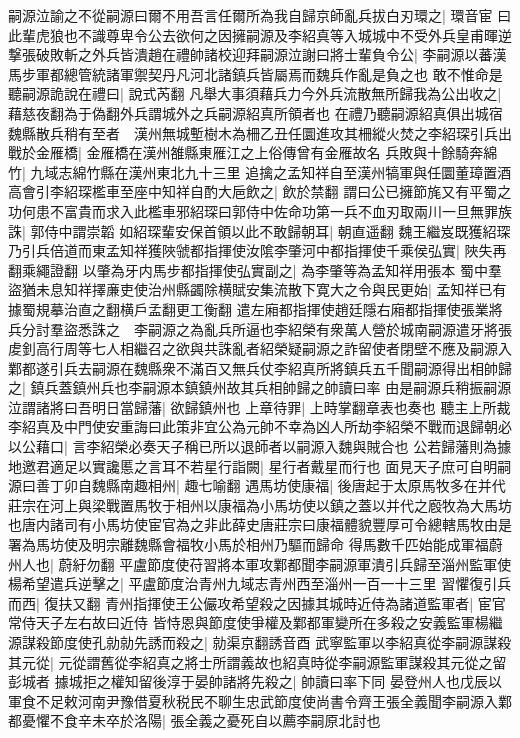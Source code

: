 嗣源泣諭之不從嗣源曰爾不用吾言任爾所為我自歸京師亂兵拔白刃環之|{
	環音宦}
曰此輩虎狼也不識尊卑令公去欲何之因擁嗣源及李紹真等入城城中不受外兵皇甫暉逆撃張破敗斬之外兵皆潰趙在禮帥諸校迎拜嗣源泣謝曰將士輩負令公|{
	李嗣源以蕃漢馬步軍都總管統諸軍禦契丹凡河北諸鎮兵皆屬焉而魏兵作亂是負之也}
敢不惟命是聽嗣源詭說在禮曰|{
	說式芮翻}
凡舉大事須藉兵力今外兵流散無所歸我為公出收之|{
	藉慈夜翻為于偽翻外兵謂城外之兵嗣源紹真所領者也}
在禮乃聽嗣源紹真俱出城宿魏縣散兵稍有至者　漢州無城塹樹木為柵乙丑任圜進攻其柵縱火焚之李紹琛引兵出戰於金雁橋|{
	金雁橋在漢州雒縣東雁江之上俗傳曾有金雁故名}
兵敗與十餘騎奔綿竹|{
	九域志綿竹縣在漢州東北九十三里}
追擒之孟知祥自至漢州犒軍與任圜董璋置酒高會引李紹琛檻車至座中知祥自酌大巵飲之|{
	飲於禁翻}
謂曰公已擁節旄又有平蜀之功何患不富貴而求入此檻車邪紹琛曰郭侍中佐命功第一兵不血刃取兩川一旦無罪族誅|{
	郭侍中謂崇韜}
如紹琛輩安保首領以此不敢歸朝耳|{
	朝直遥翻}
魏王繼岌既獲紹琛乃引兵倍道而東孟知祥獲陜虢都指揮使汝隂李肇河中都指揮使千乘侯弘實|{
	陜失再翻乘繩證翻}
以肇為牙内馬步都指揮使弘實副之|{
	為李肇等為孟知祥用張本}
蜀中羣盜猶未息知祥擇亷吏使治州縣蠲除横賦安集流散下寛大之令與民更始|{
	孟知祥已有據蜀規摹治直之翻横戶孟翻更工衡翻}
遣左廂都指揮使趙廷隱右廂都指揮使張業將兵分討羣盜悉誅之　李嗣源之為亂兵所逼也李紹榮有衆萬人營於城南嗣源遣牙將張䖍釗高行周等七人相繼召之欲與共誅亂者紹榮疑嗣源之詐留使者閉壁不應及嗣源入鄴都遂引兵去嗣源在魏縣衆不滿百又無兵仗李紹真所將鎮兵五千聞嗣源得出相帥歸之|{
	鎮兵蓋鎮州兵也李嗣源本鎮鎮州故其兵相帥歸之帥讀曰率}
由是嗣源兵稍振嗣源泣謂諸將曰吾明日當歸藩|{
	欲歸鎮州也}
上章待罪|{
	上時掌翻章表也奏也}
聽主上所裁李紹真及中門使安重誨曰此策非宜公為元帥不幸為凶人所劫李紹榮不戰而退歸朝必以公藉口|{
	言李紹榮必奏天子稱已所以退師者以嗣源入魏與賊合也}
公若歸藩則為據地邀君適足以實讒慝之言耳不若星行詣闕|{
	星行者戴星而行也}
面見天子庶可自明嗣源曰善丁卯自魏縣南趣相州|{
	趣七喻翻}
遇馬坊使康福|{
	後唐起于太原馬牧多在并代莊宗在河上與梁戰置馬牧于相州以康福為小馬坊使以鎮之蓋以并代之廏牧為大馬坊也唐内諸司有小馬坊使宦官為之非此薛史唐莊宗曰康福體貌豐厚可令總轄馬牧由是署為馬坊使及明宗離魏縣會福牧小馬於相州乃驅而歸命}
得馬數千匹始能成軍福蔚州人也|{
	蔚紆勿翻}
平盧節度使苻習將本軍攻鄴都聞李嗣源軍潰引兵歸至淄州監軍使楊希望遣兵逆擊之|{
	平盧節度治青州九域志青州西至淄州一百一十三里}
習懼復引兵而西|{
	復扶又翻}
青州指揮使王公儼攻希望殺之因據其城時近侍為諸道監軍者|{
	宦官常侍天子左右故曰近侍}
皆恃恩與節度使爭權及鄴都軍變所在多殺之安義監軍楊繼源謀殺節度使孔勍勍先誘而殺之|{
	勍渠京翻誘音酉}
武寧監軍以李紹真從李嗣源謀殺其元從|{
	元從謂舊從李紹真之將士所謂義故也紹真時從李嗣源監軍謀殺其元從之留彭城者}
據城拒之權知留後淳于晏帥諸將先殺之|{
	帥讀曰率下同}
晏登州人也戊辰以軍食不足敕河南尹豫借夏秋税民不聊生忠武節度使尚書令齊王張全義聞李嗣源入鄴都憂懼不食辛未卒於洛陽|{
	張全義之憂死自以薦李嗣原北討也}
